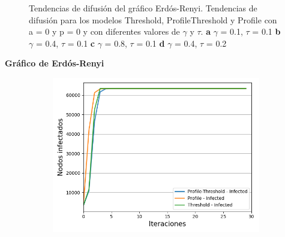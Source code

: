 \documentclass{article}
\begin{document}
\begin{figure}[!tbp]
\begin{subfigure}[b]{0.5\textwidth}
		\caption{}
		\label{fig:f4}
	\end{subfigure}
	\caption{Tendencias de difusión del gráfico Erdós-Renyi. Tendencias de difusión para los modelos Threshold, ProfileThreshold y Profile con a = 0 y p = 0 y con diferentes valores de $\gamma$ y $\tau$. \textbf{a} $\gamma$ = 0.1, $\tau$ = 0.1 \textbf{b} $\gamma$ = 0.4, $\tau$ = 0.1 \textbf{c} $\gamma$ = 0.8, $\tau$ = 0.1 \textbf{d} $\gamma$ = 0.4, $\tau$ = 0.2}
\end{figure}



\textbf{Gráfico de Erdós-Renyi}
\begin{figure}[!tbp]
	\begin{subfigure}[b]{0.5\textwidth}
		\includegraphics[width=\textwidth, height=\textwidth]{../Images/Fig 2 a).png}
		\caption{}
		\label{fig:f21}
	\end{subfigure}
	\hfill
	\begin{subfigure}[b]{0.5\textwidth}

\end{subfigure}
\end{figure}
\end{document}
